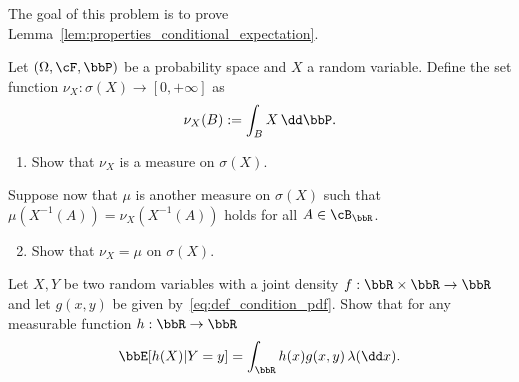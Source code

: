 %

\begin{problem}\label{prb:properties_conditional_expectation}
The goal of this problem is to prove Lemma~\ref{lem:properties_conditional_expectation}.
\end{problem}

\begin{problem}\label{prb:uniqueness_integration_measures}
Let $(\Omega, \cF, \bbP)$ be a probability space and $X$ a random variable. Define the set function $\nu_X : \sigma(X) \to [0,+\infty]$ as
\[
	\nu_X(B) := \int_B X \, \dd \bbP.
\]
\begin{enumerate}[label={(\alph*)}]
\item Show that $\nu_X$ is a measure on $\sigma(X)$.
\end{enumerate}

Suppose now that $\mu$ is another measure on $\sigma(X)$ such that $\mu(X^{-1}(A)) = \nu_X(X^{-1}(A))$ holds for all $A \in \cB_{\bbR}$.
\begin{enumerate}[label={(\alph*)}]
\setcounter{enumi}{1}
\item Show that $\nu_X = \mu$ on $\sigma(X)$.
\end{enumerate}
\end{problem}

\begin{problem}
Let $X,Y$ be two random variables with a joint density $f : \bbR \times \bbR \to \bbR$ and let $g(x,y)$ be given by~\eqref{eq:def_condition_pdf}. Show that for any measurable function $h : \bbR \to \bbR$
\[
	\bbE[h(X) | Y = y] = \int_\bbR h(x) g(x,y) \, \lambda(\dd x).
\]
\end{problem}


